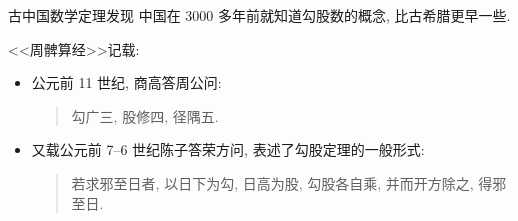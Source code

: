 \documentclass[nofonts]{beamer}
\begin{document}
\begin{frame}{古中国数学}{定理发现}
	中国在 3000 多年前就知道勾股数的概念, 比古希腊更早一些.

	<<\mbox{周髀算经}>>记载:
	\begin{itemize}
		\item 公元前 11 世纪, 商高答周公问:
		\begin{quote}
			勾广三, 股修四, 径隅五.
		\end{quote}
		\item 又载公元前 7--6 世纪陈子答荣方问, 表述了勾股定理的一般形式:
		\begin{quote}
			若求邪至日者, 以日下为勾, 日高为股, 勾股各自乘, 并而开方除之,
			得邪至日.
		\end{quote}
	\end{itemize}
\end{frame}
\end{document}
